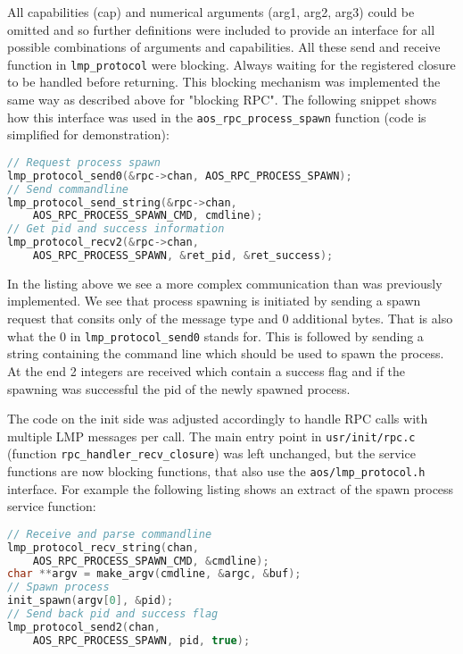 All capabilities (cap) and numerical arguments (arg1, arg2, arg3) could be omitted and so further definitions were included to provide an interface for all possible combinations of arguments and capabilities. All these send and receive function in \verb|lmp_protocol| were blocking. Always waiting for the registered closure to be handled before returning. This blocking mechanism was implemented the same way as described above for "blocking RPC". The following snippet shows how this interface was used in the \verb|aos_rpc_process_spawn| function (code is simplified for demonstration):

\begin{lstlisting}[language=c, caption=Usage of aos/lmp\_protocol in aos\_rpc\_process\_spawn]
// Request process spawn
lmp_protocol_send0(&rpc->chan, AOS_RPC_PROCESS_SPAWN);
// Send commandline
lmp_protocol_send_string(&rpc->chan,
    AOS_RPC_PROCESS_SPAWN_CMD, cmdline);
// Get pid and success information
lmp_protocol_recv2(&rpc->chan,
    AOS_RPC_PROCESS_SPAWN, &ret_pid, &ret_success);
\end{lstlisting}

In the listing above we see a more complex communication than was previously implemented. We see that process spawning is initiated by sending a spawn request that consits only of the message type and 0 additional bytes. That is also what the 0 in \verb|lmp_protocol_send0| stands for. This is followed by sending a string containing the command line which should be used to spawn the process. At the end 2 integers are received which contain a success flag and if the spawning was successful the pid of the newly spawned process.

The code on the init side was adjusted accordingly to handle RPC calls with multiple LMP messages per call. The main entry point in \verb|usr/init/rpc.c| (function \verb|rpc_handler_recv_closure|) was left unchanged, but the service functions are now blocking functions, that also use the \verb|aos/lmp_protocol.h| interface.
For example the following listing shows an extract of the spawn process service function:

\begin{lstlisting}[language=c, caption=Usage of aos/lmp\_protocol in usr/init/rpc.c]
// Receive and parse commandline
lmp_protocol_recv_string(chan,
    AOS_RPC_PROCESS_SPAWN_CMD, &cmdline);
char **argv = make_argv(cmdline, &argc, &buf);
// Spawn process
init_spawn(argv[0], &pid);
// Send back pid and success flag
lmp_protocol_send2(chan,
    AOS_RPC_PROCESS_SPAWN, pid, true);
\end{lstlisting}

